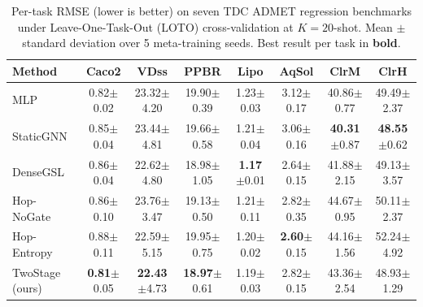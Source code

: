 \begin{table}[t]
\centering
\small
\caption{Per-task RMSE (lower is better) on seven TDC ADMET regression benchmarks under Leave-One-Task-Out (LOTO) cross-validation at $K=20$-shot. Mean $\pm$ standard deviation over 5 meta-training seeds. Best result per task in \textbf{bold}.}
\label{tab:main_k20}
\begin{tabular}{lccccccc}
\toprule
Method & Caco2 & VDss & PPBR & Lipo & AqSol & ClrM & ClrH \\
\midrule
MLP & 0.82$\pm$0.02 & 23.32$\pm$4.20 & 19.90$\pm$0.39 & 1.23$\pm$0.03 & 3.12$\pm$0.17 & 40.86$\pm$0.77 & 49.49$\pm$2.37 \\
StaticGNN & 0.85$\pm$0.04 & 23.44$\pm$4.81 & 19.66$\pm$0.58 & 1.21$\pm$0.04 & 3.06$\pm$0.16 & \textbf{40.31}$\pm$0.87 & \textbf{48.55}$\pm$0.62 \\
DenseGSL & 0.86$\pm$0.04 & 22.62$\pm$4.80 & 18.98$\pm$1.05 & \textbf{1.17}$\pm$0.01 & 2.64$\pm$0.15 & 41.88$\pm$2.15 & 49.13$\pm$3.57 \\
Hop-NoGate & 0.86$\pm$0.10 & 23.76$\pm$3.47 & 19.13$\pm$0.50 & 1.21$\pm$0.11 & 2.82$\pm$0.35 & 44.67$\pm$0.95 & 50.11$\pm$2.37 \\
Hop-Entropy & 0.88$\pm$0.11 & 22.59$\pm$5.15 & 19.95$\pm$0.75 & 1.20$\pm$0.02 & \textbf{2.60}$\pm$0.15 & 44.16$\pm$1.56 & 52.24$\pm$4.92 \\
TwoStage (ours) & \textbf{0.81}$\pm$0.05 & \textbf{22.43}$\pm$4.73 & \textbf{18.97}$\pm$0.61 & 1.19$\pm$0.03 & 2.82$\pm$0.15 & 43.36$\pm$2.54 & 48.93$\pm$1.29 \\
\bottomrule
\end{tabular}
\end{table}